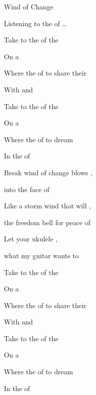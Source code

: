 \begin{SBSong}{Wind of Change}
\begin{SBVerse}
    Listening to the  of \ldots{} 
  \end{SBVerse}
  \CBPageBrk
  \begin{SBChorus}
     Take  to the  of the 

    On a  

    Where the  of to share their 

    With  and 
  \end{SBChorus}
  \begin{SBChorus}
     Take  to the  of the 

    On a  

    Where the  of to dream 

    In the  of 
  \end{SBChorus}
  \begin{SBBracket}{Break}
     wind of change blows ,

    into the face of 

    Like a storm wind that will ,

    the freedom bell for peace of 

    Let your ukulele ,

    what my guitar wants to  
  \end{SBBracket}
  \begin{SBChorus}
     Take  to the  of the 

    On a  

    Where the  of to share their 

    With  and 
  \end{SBChorus}
  \begin{SBChorus}
     Take  to the  of the 

    On a  

    Where the  of to dream 

    In the  of 
  \end{SBChorus}
\end{SBSong}